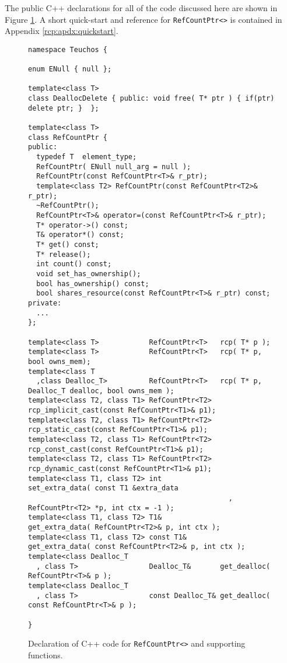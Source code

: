 The public C++ declarations for all of the code discussed here are
shown in Figure {}\ref{rcp:fig:decl}.  A short quick-start and
reference for {}\texttt{RefCountPtr<>} is contained in Appendix
{}\ref{rcp:apdx:quickstart}.

\begin{figure}
{\scriptsize\begin{verbatim}
namespace Teuchos {

enum ENull { null };

template<class T>
class DeallocDelete { public: void free( T* ptr ) { if(ptr) delete ptr; }  };

template<class T>
class RefCountPtr {
public:
  typedef T  element_type;
  RefCountPtr( ENull null_arg = null );
  RefCountPtr(const RefCountPtr<T>& r_ptr);
  template<class T2> RefCountPtr(const RefCountPtr<T2>& r_ptr);
  ~RefCountPtr();
  RefCountPtr<T>& operator=(const RefCountPtr<T>& r_ptr);
  T* operator->() const;
  T& operator*() const;
  T* get() const;
  T* release();
  int count() const;
  void set_has_ownership();
  bool has_ownership() const;
  bool shares_resource(const RefCountPtr<T>& r_ptr) const;
private:
  ...
};

template<class T>            RefCountPtr<T>   rcp( T* p );
template<class T>            RefCountPtr<T>   rcp( T* p, bool owns_mem);
template<class T
  ,class Dealloc_T>          RefCountPtr<T>   rcp( T* p, Dealloc_T dealloc, bool owns_mem );
template<class T2, class T1> RefCountPtr<T2>  rcp_implicit_cast(const RefCountPtr<T1>& p1);
template<class T2, class T1> RefCountPtr<T2>  rcp_static_cast(const RefCountPtr<T1>& p1);
template<class T2, class T1> RefCountPtr<T2>  rcp_const_cast(const RefCountPtr<T1>& p1);
template<class T2, class T1> RefCountPtr<T2>  rcp_dynamic_cast(const RefCountPtr<T1>& p1);
template<class T1, class T2> int              set_extra_data( const T1 &extra_data
                                                , RefCountPtr<T2> *p, int ctx = -1 );
template<class T1, class T2> T1&              get_extra_data( RefCountPtr<T2>& p, int ctx );
template<class T1, class T2> const T1&        get_extra_data( const RefCountPtr<T2>& p, int ctx );
template<class Dealloc_T
  , class T>                 Dealloc_T&       get_dealloc( RefCountPtr<T>& p );
template<class Dealloc_T
  , class T>                 const Dealloc_T& get_dealloc( const RefCountPtr<T>& p );

}
\end{verbatim}}
\caption{\label{rcp:fig:decl}
Declaration of C++ code for {}\texttt{RefCountPtr<>} and supporting functions.}
\end{figure}

